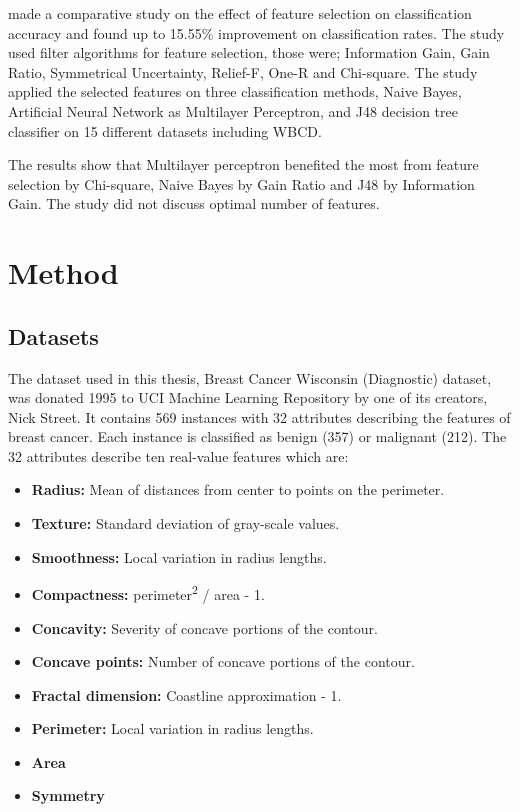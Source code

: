 \documentclass{kththesis}
\begin{document}
\textcite{karabulut2012} made a comparative study on the effect of feature selection on classification accuracy and found up to 15.55\% improvement on classification rates. The study used filter algorithms for feature selection, those were; Information Gain, Gain Ratio, Symmetrical Uncertainty, Relief-F, One-R and Chi-square. The study applied the selected features on three classification methods, Naive Bayes, Artificial Neural Network as Multilayer Perceptron, and J48 decision tree classifier on 15 different datasets including WBCD.

The results show that Multilayer perceptron benefited the most from feature selection by Chi-square, Naive Bayes by Gain Ratio and J48 by Information Gain. The study did not discuss optimal number of features.

\chapter{Method}

\section{Datasets}
\label{sec:Datasets}


The dataset used in this thesis, Breast Cancer Wisconsin (Diagnostic) dataset, was donated 1995 to UCI  Machine Learning Repository \parencite{dua:2017} by one of its creators, Nick Street. It contains 569 instances with 32 attributes describing the features of breast cancer. Each instance is classified as benign (357) or malignant (212). The 32 attributes describe ten real-value features which are:

\begin{itemize} \itemsep0pt \parskip0pt 
	\item \textbf{Radius:} Mean of distances from center to points on the perimeter.
	\item \textbf{Texture:} Standard deviation of gray-scale values.
	\item \textbf{Smoothness:} Local variation in radius lengths.
  \item \textbf{Compactness:} perimeter\textsuperscript{2} / area - 1.
  \item \textbf{Concavity:} Severity of concave portions of the contour.
  \item \textbf{Concave points:} Number of concave portions of the contour.
  \item \textbf{Fractal dimension:} Coastline approximation - 1.
  \item \textbf{Perimeter:} Local variation in radius lengths.
  \item \textbf{Area}
  \item \textbf{Symmetry}
\end{itemize}
\end{document}
